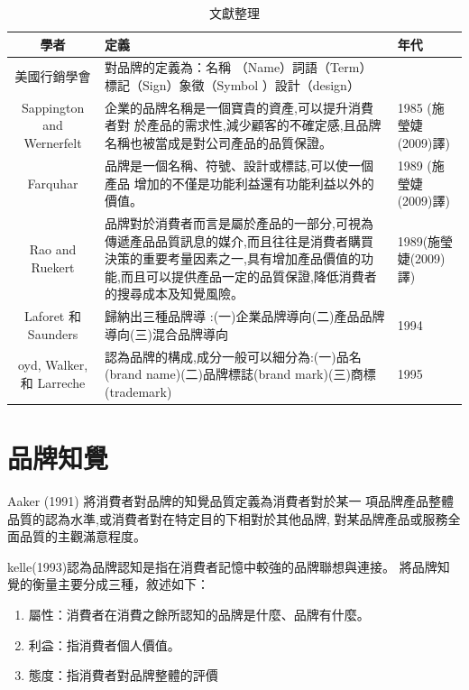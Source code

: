\begin{table}[htb]
\caption{文獻整理}
\label{tab:PL1}
\centering
%
\begin{tabular}[t]{|c|p{8.5cm}|p{2.5cm}|} %
\hline
學者&定義 & 年代 \tabularnewline
\hline
美國行銷學會 & 對品牌的定義為：名稱 （Name）詞語（Term） 標記（Sign）象徵（Symbol ）設計（design）&  \tabularnewline
\hline
Sappington and Wernerfelt  &企業的品牌名稱是一個寶貴的資產,可以提升消費者對
於產品的需求性,減少顧客的不確定感,且品牌名稱也被當成是對公司產品的品質保證。& 1985 (施瑩婕(2009)譯) \tabularnewline
\hline
Farquhar &品牌是一個名稱、符號、設計或標誌,可以使一個產品
增加的不僅是功能利益還有功能利益以外的價值。&1989 (施瑩婕(2009)譯) \tabularnewline
\hline
Rao and Ruekert &品牌對於消費者而言是屬於產品的一部分,可視為傳遞產品品質訊息的媒介,而且往往是消費者購買決策的重要考量因素之一,具有增加產品價值的功能,而且可以提供產品一定的品質保證,降低消費者的搜尋成本及知覺風險。&1989(施瑩婕(2009)譯)  \tabularnewline
\hline
 Laforet 和 Saunders&歸納出三種品牌導 :(一)企業品牌導向(二)產品品牌導向(三)混合品牌導向
&1994\tabularnewline
\hline
oyd, Walker, 和 Larreche&認為品牌的構成,成分一般可以細分為:(一)品名(brand name)(二)品牌標誌(brand mark)(三)商標(trademark)&1995\tabularnewline
\hline
\end{tabular}
\end{table}

\section{品牌知覺}
Aaker (1991) \cite{Aaker1991}將消費者對品牌的知覺品質定義為消費者對於某一 項品牌產品整體品質的認為水準,或消費者對在特定目的下相對於其他品牌, 對某品牌產品或服務全面品質的主觀滿意程度。

kelle(1993)\cite{Keller1993}認為品牌認知是指在消費者記憶中較強的品牌聯想與連接。
將品牌知覺的衡量主要分成三種，敘述如下：
\begin{enumerate}
\item 屬性：消費者在消費之餘所認知的品牌是什麼、品牌有什麼。
\item 利益：指消費者個人價值。
\item 態度：指消費者對品牌整體的評價
\end{enumerate}


